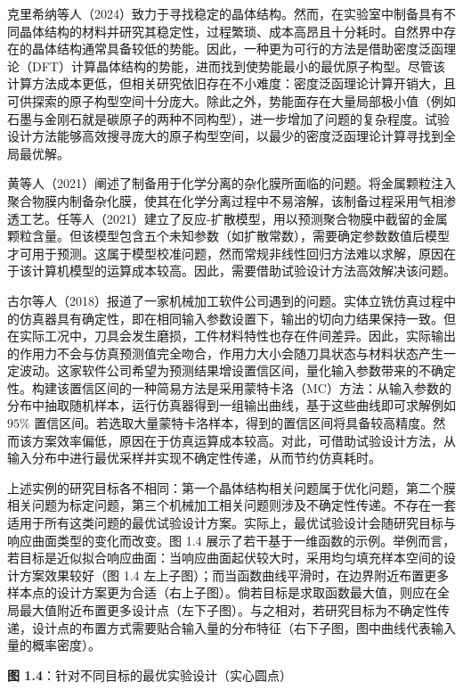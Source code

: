 \documentclass{ctexart}
\begin{document}
克里希纳等人（2024）致力于寻找稳定的晶体结构。然而，在实验室中制备具有不同晶体结构的材料并研究其稳定性，过程繁琐、成本高昂且十分耗时。自然界中存在的晶体结构通常具备较低的势能。因此，一种更为可行的方法是借助密度泛函理论（DFT）计算晶体结构的势能，进而找到使势能最小的最优原子构型。尽管该计算方法成本更低，但相关研究依旧存在不小难度：密度泛函理论计算开销大，且可供探索的原子构型空间十分庞大。除此之外，势能面存在大量局部极小值（例如石墨与金刚石就是碳原子的两种不同构型），进一步增加了问题的复杂程度。试验设计方法能够高效搜寻庞大的原子构型空间，以最少的密度泛函理论计算寻找到全局最优解。

黄等人（2021）阐述了制备用于化学分离的杂化膜所面临的问题。将金属颗粒注入聚合物膜内制备杂化膜，使其在化学分离过程中不易溶解，该制备过程采用气相渗透工艺。任等人（2021）建立了反应-扩散模型，用以预测聚合物膜中截留的金属颗粒含量。但该模型包含五个未知参数（如扩散常数），需要确定参数数值后模型才可用于预测。这属于模型校准问题，然而常规非线性回归方法难以求解，原因在于该计算机模型的运算成本较高。因此，需要借助试验设计方法高效解决该问题。

古尔等人（2018）报道了一家机械加工软件公司遇到的问题。实体立铣仿真过程中的仿真器具有确定性，即在相同输入参数设置下，输出的切向力结果保持一致。但在实际工况中，刀具会发生磨损，工件材料特性也存在件间差异。因此，实际输出的作用力不会与仿真预测值完全吻合，作用力大小会随刀具状态与材料状态产生一定波动。这家软件公司希望为预测结果增设置信区间，量化输入参数带来的不确定性。构建该置信区间的一种简易方法是采用蒙特卡洛（MC）方法：从输入参数的分布中抽取随机样本，运行仿真器得到一组输出曲线，基于这些曲线即可求解例如 $95\%$ 置信区间。若选取大量蒙特卡洛样本，得到的置信区间将具备较高精度。然而该方案效率偏低，原因在于仿真运算成本较高。对此，可借助试验设计方法，从输入分布中进行最优采样并实现不确定性传递，从而节约仿真耗时。

上述实例的研究目标各不相同：第一个晶体结构相关问题属于优化问题，第二个膜相关问题为标定问题，第三个机械加工相关问题则涉及不确定性传递。不存在一套适用于所有这类问题的最优试验设计方案。实际上，最优试验设计会随研究目标与响应曲面类型的变化而改变。图 1.4 展示了若干基于一维函数的示例。举例而言，若目标是近似拟合响应曲面：当响应曲面起伏较大时，采用均匀填充样本空间的设计方案效果较好（图 1.4 左上子图）；而当函数曲线平滑时，在边界附近布置更多样本点的设计方案更为合适（右上子图）。倘若目标是求取函数最大值，则应在全局最大值附近布置更多设计点（左下子图）。与之相对，若研究目标为不确定性传递，设计点的布置方式需要贴合输入量的分布特征（右下子图，图中曲线代表输入量的概率密度）。

\begin{mdquote}
\textbf{图 1.4}：针对不同目标的最优实验设计（实心圆点）
\end{mdquote}
\end{document}
